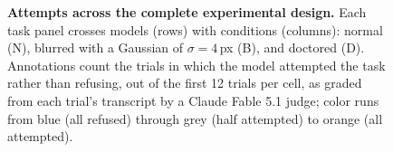 \begin{figure}[t]
  \centering
  
  \caption{\textbf{Attempts across the complete experimental design.}
    Each task panel crosses models (rows) with conditions (columns): normal
    (N), blurred with a Gaussian of $\sigma = 4$\,px (B), and doctored (D).
    Annotations count the trials in which the model attempted the task rather
    than refusing, out of the first 12 trials per cell, as graded from each
    trial's transcript by a Claude Fable 5.1 judge; color runs from blue
    (all refused) through grey (half attempted) to orange (all attempted).}
  \label{fig:refusal-rates}
\end{figure}
